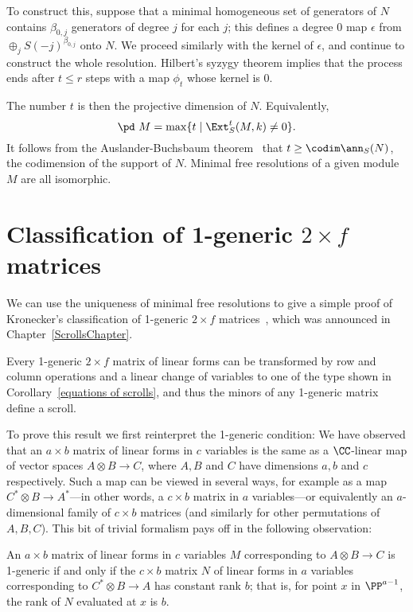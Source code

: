 To construct this, suppose that a minimal homogeneous set of generators of $N$
contains $\beta_{0,j}$ generators of degree $j$ for each $j$; this defines a degree 0 map $\epsilon$
from 
$
\oplus_jS(-j)^{\beta_{0,j}}
$
onto $N$. We proceed similarly with the kernel of $\epsilon$, and continue to construct the whole resolution.
Hilbert's syzygy theorem \cite[Corollary 19.7]{Eisenbud1995} implies that the process ends after $t\leq r$ steps with a map $\phi_t$ whose
kernel is 0. 

The number $t$ is then the projective dimension of $N$. 
Equivalently, 
$$
\pd\ M = \max\{t \mid \Ext_S^t(M,k) \neq 0 \}.
$$
It follows from the Auslander-Buchsbaum
theorem~\cite[Theorem 19.9]{Eisenbud1995} that $t \geq \codim \ann_S(N)$, the codimension of the support of $N$.
Minimal free resolutions of a given module $M$ are all isomorphic.

\section{Classification of 1-generic $2\times f$ matrices}\label{Kronecker}

We can use the uniqueness of minimal free resolutions to give a simple proof of Kronecker's classification of 1-generic $2\times f$
 matrices~\cite{Gantmacher}, which was announced in Chapter~\ref{ScrollsChapter}.
 
\begin{theorem}\label{matrix pencils}
 Every
 1-generic $2 \times f$ matrix of linear forms can be transformed by row and column operations and a linear change
 of variables to one of the type shown in
Corollary~\ref{equations of scrolls}, and thus the minors of any 1-generic matrix define a scroll. 
\end{theorem}


To prove this result we first reinterpret the 1-generic condition:
We have observed that an
$a\times b$ matrix of linear forms in $c$ variables is the same as a $\CC$-linear map of vector spaces
$A \otimes B \to C$, where $A, B$ and $C$ have dimensions $a,b$ and $c$ respectively. Such a map
can be viewed in several ways, for example as a map $C^{*} \otimes B\to A^{*}$---in other words, a $c\times b$ matrix in $a$ variables---or equivalently an $a$-dimensional family of $c\times b$ matrices (and similarly for other permutations of $A,B,C$). 
This bit of trivial formalism pays off in the following observation:

\begin{proposition}\label{reinterpretation of 1-generic}
An  $a\times b$ matrix of linear forms in $c$ variables $M$ corresponding to $A\otimes B \to C$ is 1-generic if and only if the $c \times b$ matrix $N$ of linear forms in $a$ variables corresponding to $C^{*}\otimes B \to A$ has constant rank $b$; that is, 
for point $x$ in $\PP^{a-1}$, the rank of $N$ evaluated at $x$ is $b$.
\end{proposition}

